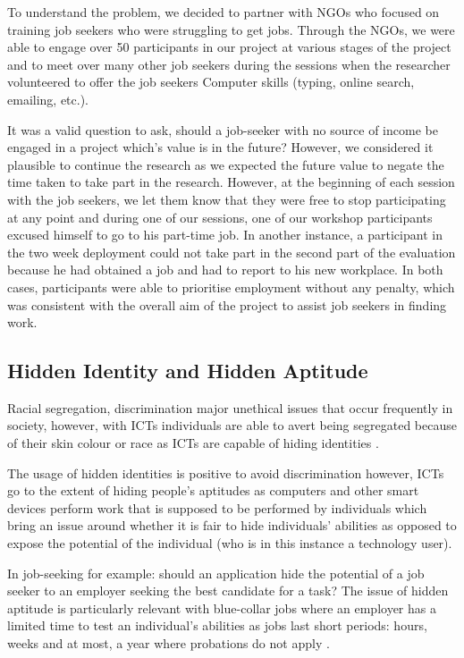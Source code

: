 To understand the problem, we decided to partner with NGOs who focused on training job seekers who were struggling to get jobs. Through the NGOs, we were able to engage over 50 participants in our project at various stages of the project and to meet over many other job seekers during the sessions when the researcher volunteered to offer the job seekers Computer skills (typing, online search, emailing, etc.). 

It was a valid question to ask, should a job-seeker with no source of income be engaged in a project which’s value is in the future? However, we considered it plausible to continue the research as we expected the future value to negate the time taken to take part in the research. However, at the beginning of each session with the job seekers, we let them know that they were free to stop participating at any point and during one of our sessions, one of our workshop participants excused himself to go to his part-time job. In another instance, a participant in the two week deployment could not take part in the second part of the evaluation because he had obtained a job and had to report to his new workplace. In both cases, participants were able to prioritise employment without any penalty, which was consistent with the overall aim of the project to assist job seekers in finding work.

\subsection{Hidden Identity and Hidden Aptitude}

Racial segregation, discrimination major unethical issues that occur frequently in society, however, with ICTs individuals are able to avert being segregated because of their skin colour or race as ICTs are capable of hiding identities \cite{chepken2012tele}. 

The usage of hidden identities is positive to avoid discrimination however, ICTs go to the extent of hiding people’s aptitudes as computers and other smart devices perform work that is supposed to be performed by individuals which bring an issue around whether it is fair to hide individuals’ abilities as opposed to expose the potential of the individual (who is in this instance a technology user). 

In job-seeking for example: should an application hide the potential of a job seeker to an employer seeking the best candidate for a task? The issue of hidden aptitude is particularly relevant with blue-collar jobs where an employer has a limited time to test an individual’s abilities as jobs last short periods: hours, weeks and at most, a year where probations do not apply \cite{chepken2012tele}. 

